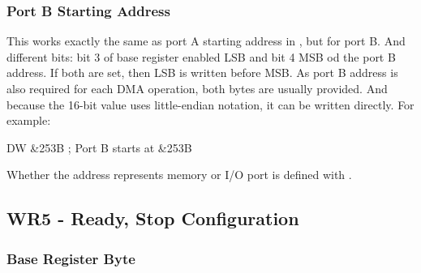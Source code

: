 {\begin{DMADescription}
\end{DMADescription}


\subsubsection{Port B Starting Address}

This works exactly the same as port A starting address in , but for port B. And different bits: bit 3 of base register enabled LSB and bit 4 MSB od the port B address. If both are set, then LSB is written before MSB. As port B address is also required for each DMA operation, both bytes are usually provided. And because the 16-bit value uses little-endian notation, it can be written directly. For example:

\begin{tcblisting}{}
	DW &253B          ; Port B starts at &253B
\end{tcblisting}
\vspace*{-1ex}

Whether the address represents memory or I/O port is defined with .


\subsection{WR5 - Ready, Stop Configuration}




\subsubsection{Base Register Byte}

}
